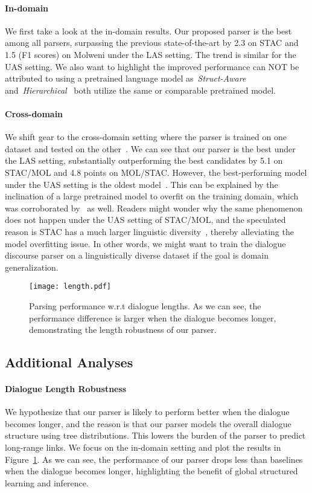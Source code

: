 \documentclass[11pt]{article}
\begin{document}
\paragraph{In-domain}
We first take a look at the in-domain results. Our proposed parser is the best among all parsers, surpassing the previous state-of-the-art by 2.3 on STAC and 1.5 (F1 scores) on Molweni under the LAS setting. The trend is similar for the UAS setting. We also want to highlight the improved performance can NOT be attributed to using a pretrained language model as~\emph{Struct-Aware} and~\emph{Hierarchical}~\cite{liu-chen-2021-improving} both utilize the same or comparable pretrained model.
\paragraph{Cross-domain}
We shift gear to the cross-domain setting where the parser is trained on one dataset and tested on the other~\cite{liu-chen-2021-improving}. We can see that our parser is the best under the LAS setting, substantially outperforming the best candidates by 5.1 on STAC/MOL and 4.8 points on MOL/STAC.
However, the best-performing model under the UAS setting is the oldest model~\cite{afantenos2015discourse,perret2016integer}. This can be explained by the inclination of a large pretrained model to overfit on the training domain, which was corroborated by~\citet{liu-chen-2021-improving} as well. Readers might wonder why the same phenomenon does not happen under the UAS setting of STAC/MOL, and the speculated reason is STAC has a much larger linguistic diversity~\cite{liu-chen-2021-improving}, thereby alleviating the model overfitting issue. In other words, we might want to train the dialogue discourse parser on a linguistically diverse dataset if the goal is domain generalization.

\begin{figure}[]
\texttt{[image: length.pdf]}
\caption{Parsing performance w.r.t dialogue lengths. As we can see, the performance difference is larger when the dialogue becomes longer, demonstrating the length robustness of our parser.}
\label{fig:length}
\end{figure}


\subsection{Additional Analyses}
\paragraph{Dialogue Length Robustness}
We hypothesize that our parser is likely to perform better when the dialogue becomes longer, and the reason is that our parser models the overall dialogue structure using tree distributions. This lowers the burden of the parser to predict long-range links.
We focus on the in-domain setting and plot the results in Figure~\ref{fig:length}. As we can see, the performance of our parser drops less than baselines when the dialogue becomes longer, highlighting the benefit of global structured learning and inference.
\end{document}

